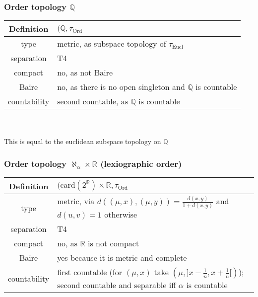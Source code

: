 \documentclass{scrartcl}
\newcommand{\R}{\mathbb{R}}
\newcommand{\Q}{\mathbb{Q}}
\begin{document}
\subsubsection{Order topology $\Q$}

\begin{tabular}{c | p{}}
    Definition & $(\Q, \tau_{\mathrm{Ord}}$ \\
    \hline
    type & metric, as subspace topology of $\tau_{\mathrm{Eucl}}$ \\
    separation & T4 \\
    compact & no, as not Baire \\
    Baire & no, as there is no open singleton and $\Q$ is countable \\
    countability & second countable, as $\Q$ is countable
\end{tabular}
\\\\
This is equal to the euclidean subspace topology on $\Q$ 

\subsubsection{Order topology $\aleph_\alpha \times \R$ (lexiographic order)}

\begin{tabular}{c | p{}}
    Definition & $(\mathrm{card}(2^\R) \times \R, \tau_{\mathrm{Ord}}$ \\
    \hline
    type & metric, via $d((\mu, x), (\mu, y)) = \frac{d(x, y)}{1 + d(x, y)}$ and $d(u, v) = 1$ otherwise \\
    separation & T4 \\
    compact & no, as $\R$ is not compact \\
    Baire & yes because it is metric and complete \\
    countability & first countable (for $(\mu, x)$ take $(\mu, ]x - \frac 1 n, x + \frac 1 n[)$); second countable and separable iff $\alpha$ is countable
\end{tabular}
\end{document}
